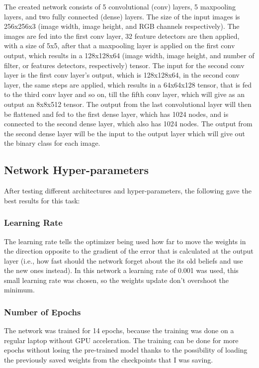 \documentclass{article}
\begin{document}
\begin{adjustwidth}{-40pt}{-40pt}
The created network consists of 5 convolutional (conv) layers, 5 maxpooling layers, and two fully connected (dense) layers.
The size of the input images is 256x256x3 (image width, image height, and RGB channels respectively). The images are fed into the first conv layer, 32 feature detectors are then applied, with a size of 5x5, after that a maxpooling layer is applied on the first conv output, which results in a 128x128x64 (image width, image height, and number of filter, or features detectors, respectively) tensor.
The input for the second conv layer is the first conv layer's output, which is 128x128x64, in the second conv layer, the same steps are applied, which results in a 64x64x128 tensor, that is fed to the third conv layer and so on, till the fifth conv layer, which will give as an output an 8x8x512 tensor. The output from the last convolutional layer will then be flattened and fed to the first dense layer, which has 1024 nodes, and is connected to the second dense layer, which also has 1024 nodes. The output from the second dense layer will be the input to the output layer which will give out the binary class for each image.


\subsection{Network Hyper-parameters}

After testing different architectures and hyper-parameters, the following gave the best results for this task:

\subsubsection{Learning Rate}
The learning rate tells the optimizer being used how far to move the weights in the direction opposite to the gradient of the error that is calculated at the output layer (i.e., how fast should the network forget about the its old beliefs and use the new ones instead). In this network a learning rate of 0.001 was used, this small learning rate was chosen, so the weights update don't overshoot the minimum.

\subsubsection{Number of Epochs}
The network was trained for 14 epochs, because the training was done on a regular laptop without GPU acceleration. The training can be done for more epochs without losing the pre-trained model thanks to the possibility of loading the previously saved weights from the checkpoints that I was saving.


\end{adjustwidth}
\end{document}
